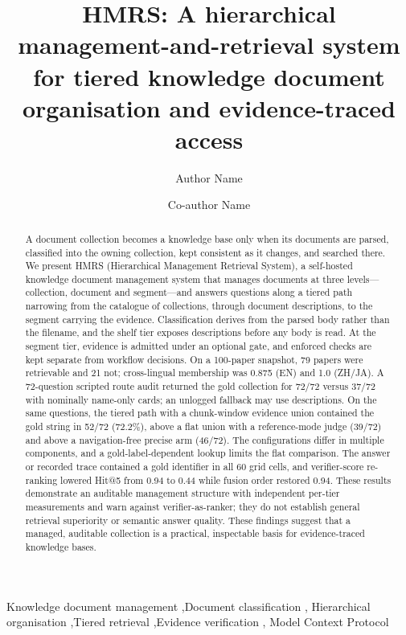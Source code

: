 \documentclass[final,5p,times,twocolumn]{elsarticle}
\begin{document}
\begin{frontmatter}

\title{HMRS: A hierarchical management-and-retrieval system for tiered
knowledge document organisation and evidence-traced access}

\author[inst1]{Author Name}
\author[inst1]{Co-author Name}

\begin{abstract}
A document collection becomes a knowledge base only when its documents are
parsed, classified into the owning collection, kept consistent as it changes,
and searched there. We present HMRS (Hierarchical Management Retrieval
System), a self-hosted knowledge document management system that manages
documents at three levels---collection, document and segment---and answers
questions along a tiered path narrowing from the catalogue of collections,
through document descriptions, to the segment carrying the evidence.
Classification derives from the parsed body rather than the filename, and the
shelf tier exposes descriptions before any body is read. At the segment tier,
evidence is admitted under an optional gate, and enforced checks are kept
separate from workflow decisions.
On a 100-paper snapshot, 79 papers were retrievable and 21 not; cross-lingual
membership was 0.875 (EN) and 1.0 (ZH/JA). A 72-question
scripted route audit returned the gold collection for 72/72 versus 37/72
with nominally name-only cards; an unlogged fallback may use descriptions. On the same questions, the tiered path with a chunk-window evidence
union contained the gold string in 52/72 (72.2\%), above a
flat union with a reference-mode judge (39/72) and above a
navigation-free precise arm (46/72). The configurations differ in multiple
components, and a gold-label-dependent lookup limits the flat comparison. The answer or recorded
trace contained a gold identifier in all 60 grid cells, and verifier-score re-ranking lowered Hit@5 from
0.94 to 0.44 while fusion order restored 0.94. These results demonstrate an
auditable management structure with independent per-tier measurements and warn
against verifier-as-ranker; they do not establish general retrieval superiority
or semantic answer quality. These findings suggest that a managed, auditable
collection is a practical, inspectable basis for evidence-traced knowledge
bases.
\end{abstract}

\begin{keyword}
Knowledge document management \sep Document classification \sep
Hierarchical organisation \sep Tiered retrieval \sep Evidence verification \sep
Model Context Protocol
\end{keyword}

\end{frontmatter}
\end{document}
